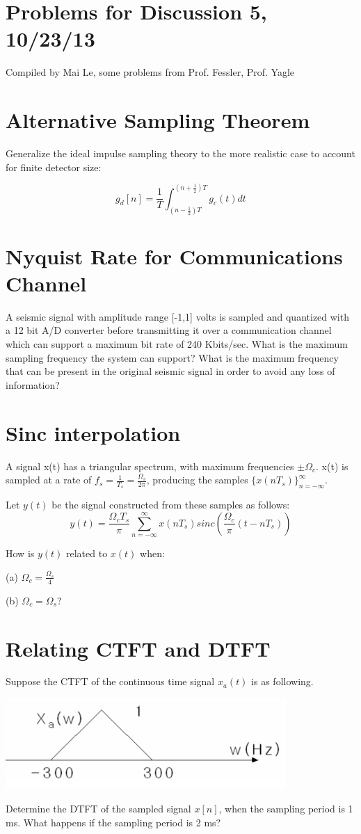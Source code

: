 \documentclass[11pt]{article}
\begin{document}
{\small
\section*{Problems for Discussion 5, 10/23/13}
Compiled by Mai Le, some problems from Prof. Fessler, Prof. Yagle
}

\section{Alternative Sampling Theorem}

Generalize the ideal impulse sampling theory to the more realistic case to account for finite detector size:

\[
g_d[n] = \frac{1}{T}\int_{(n-\frac{1}{2})T}^{(n+\frac{1}{2})T} g_c(t) dt
\]

\section{Nyquist Rate for Communications Channel}

A seismic signal with amplitude range [-1,1] volts is sampled and quantized with a 12 bit A/D converter before transmitting it over a communication channel which can support a maximum bit rate of 240 Kbits/sec. What is the maximum sampling frequency the system can support? What is the maximum frequency that can be present in the original seismic signal in order to avoid any loss of information?

\section{Sinc interpolation}
A signal x(t) has a triangular spectrum, with maximum frequencies $\pm \Omega_c$. x(t) is sampled at a rate of $f_s = \frac{1}{T_s}=\frac{\Omega_s}{2 \pi}$, producing the samples $\{x(nT_s)\}_{n=-\infty}^\infty$.

Let $y(t)$ be the signal constructed from these samples as follows:
\[
y(t) = \frac{ \Omega_c T_s}{\pi} \sum_{n=-\infty}^\infty x(nT_s) sinc\left( \frac{\Omega_c}{\pi} (t-nT_s) \right)
\]

How is $y(t)$ related to $x(t)$ when:

(a) $\Omega_c = \frac{\Omega_s}{4}$ 

(b) $\Omega_c = \Omega_s$?

\section{Relating CTFT and DTFT}

Suppose the CTFT of the continuous time signal $x_a(t)$ is as following.

\includegraphics[width = 0.8\textwidth]{CTFT_p4.png} 

Determine the DTFT of the sampled signal $x[n]$, when the sampling period is 1 ms. What happens if the sampling period is 2 ms?
\end{document}
